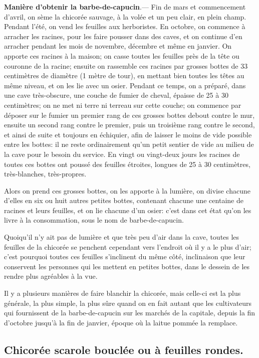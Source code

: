 \documentclass[10pt,a4paper]{book}
\begin{document}
\textbf{Manière d'obtenir la barbe-de-capucin}.--- Fin de mars et commencement d'avril, on sème la chicorée sauvage, à la volée et un peu clair, en plein champ. Pendant l'été, on vend les feuilles aux herboristes. En octobre, on commence à arracher les racines, pour les faire pousser dans des caves, et on continue d'en arracher pendant les mois de novembre, décembre et même en janvier. On apporte ces racines à la maison; on casse toutes les feuilles près de la tête ou couronne de la racine; ensuite on rassemble ces racines par grosses bottes de 33 centimètres de diamètre (1 mètre de tour), en mettant bien toutes les têtes au même niveau, et on les lie avec un osier. Pendant ce temps, on a préparé, dans une cave très-obscure, une couche de fumier de cheval, épaisse de 25 à 30 centimètres; on ne met ni terre ni terreau sur cette couche; on commence par déposer sur le fumier un premier rang de ces grosses bottes debout contre le mur, ensuite un second rang contre le premier, puis un troisième rang contre le second, et ainsi de suite et toujours en échiquier, afin de laisser le moins de vide possible entre les bottes: il ne reste ordinairement qu’un petit sentier de vide au milieu de la cave pour le besoin du service. En vingt ou vingt-deux jours les racines de toutes ces bottes ont poussé des feuilles étroites, longues de 25 à 30 centimètres, très-blanches, très-propres.

Alors on prend ces grosses bottes, on les apporte à la lumière, on divise chacune d'elles en six ou huit autres petites bottes, contenant chacune une centaine de racines et leurs feuilles, et on lie chacune d'un osier: c'est dans cet état qu'on les livre à la consommation, sous le nom de barbe-de-capucin.

Quoiqu'il n'y ait pas de lumière et que très peu d'air dans la cave, toutes les feuilles de la chicorée se penchent cependant vers l'endroit où il y a le plus d'air; c'est pourquoi toutes ces feuilles s'inclinent du même côté, inclinaison que leur conservent les personnes qui les mettent en petites bottes, dans le dessein de les rendre plus agréables à la vue.

Il y a plusieurs manières de faire blanchir la chicorée, mais celle-ci est la plus générale, la plus simple, la plus sûre quand on en fait autant que les cultivateurs qui fournissent de la barbe-de-capucin sur les marchés de la capitale, depuis la fin d'octobre jusqu'à la fin de janvier, époque où la laitue pommée la remplace.

\subsection{Chicorée scarole bouclée ou à feuilles rondes.}
\end{document}
